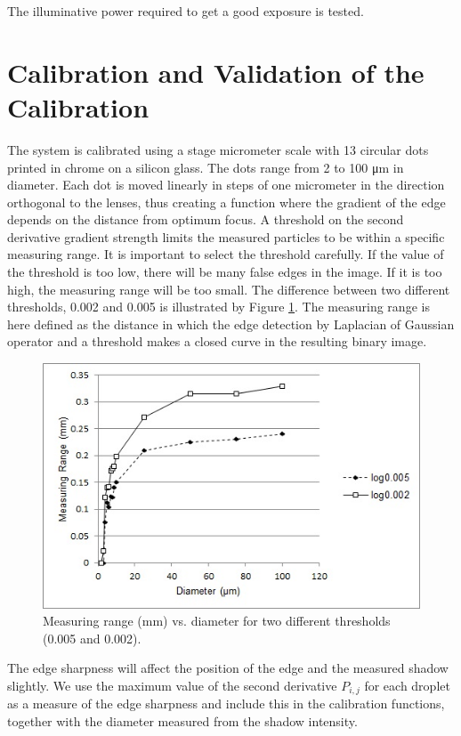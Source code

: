 The illuminative power required to get a good exposure is tested.

\section{Calibration and Validation of the Calibration}

The system is calibrated using a stage micrometer scale with 13 circular dots printed in chrome on a silicon glass. The dots range from 2 to 100 μm in diameter. Each dot is moved linearly in steps of one micrometer in the direction orthogonal to the lenses, thus creating a function where the gradient of the edge depends on the distance from optimum focus. A threshold on the second derivative gradient strength limits the measured particles to be within a specific measuring range. It is important to select the threshold carefully. If the value of the threshold is too low, there will be many false edges in the image. If it is too high, the measuring range will be too small. The difference between two different thresholds, 0.002 and 0.005 is illustrated by Figure \ref{fig:measrangevslogth}.  The measuring range is here defined as the distance in which the edge detection by Laplacian of Gaussian operator and a threshold makes a closed curve in the resulting binary image.

\begin{figure}[ht]
\centering\includegraphics[width=0.75\linewidth]{figures/meas_range_vs_log_th}
\caption{Measuring range (mm) vs. diameter for two different thresholds (0.005 and 0.002).}
\label{fig:measrangevslogth}
\end{figure}

The edge sharpness will affect the position of the edge and the measured shadow slightly. We use the maximum value of the second derivative $P_{i,j}$ for each droplet as a measure of the edge sharpness and include this in the calibration functions, together with the diameter measured from the shadow intensity.

